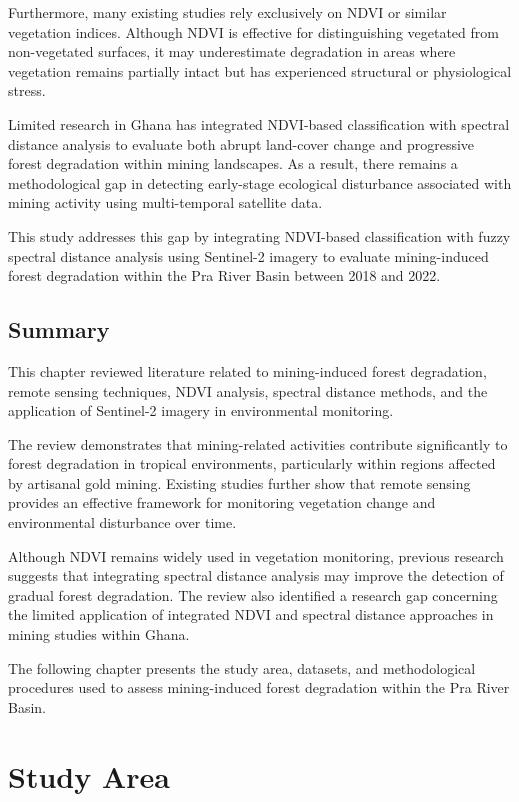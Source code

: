 \documentclass[a4paper,12pt]{report}
\begin{document}
Furthermore, many existing studies rely exclusively on NDVI or similar vegetation indices. Although NDVI is effective for distinguishing vegetated from non-vegetated surfaces, it may underestimate degradation in areas where vegetation remains partially intact but has experienced structural or physiological stress.

Limited research in Ghana has integrated NDVI-based classification with spectral distance analysis to evaluate both abrupt land-cover change and progressive forest degradation within mining landscapes. As a result, there remains a methodological gap in detecting early-stage ecological disturbance associated with mining activity using multi-temporal satellite data.

This study addresses this gap by integrating NDVI-based classification with fuzzy spectral distance analysis using Sentinel-2 imagery to evaluate mining-induced forest degradation within the Pra River Basin between 2018 and 2022.


\section{Summary}

This chapter reviewed literature related to mining-induced forest degradation, remote sensing techniques, NDVI analysis, spectral distance methods, and the application of Sentinel-2 imagery in environmental monitoring.

The review demonstrates that mining-related activities contribute significantly to forest degradation in tropical environments, particularly within regions affected by artisanal gold mining. Existing studies further show that remote sensing provides an effective framework for monitoring vegetation change and environmental disturbance over time.

Although NDVI remains widely used in vegetation monitoring, previous research suggests that integrating spectral distance analysis may improve the detection of gradual forest degradation. The review also identified a research gap concerning the limited application of integrated NDVI and spectral distance approaches in mining studies within Ghana.

The following chapter presents the study area, datasets, and methodological procedures used to assess mining-induced forest degradation within the Pra River Basin.


\chapter{Study Area}
\end{document}
